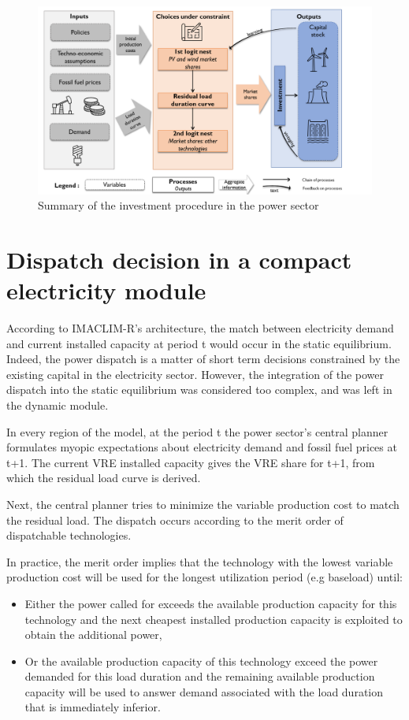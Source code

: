{\begin{figure}[H]
\includegraphics[scale=0.45]{figures&tables/Summary_nexus.png}
\centering
\caption{Summary of the investment procedure in the power sector}
\label{fig:suminv}
\end{figure}


\section{Dispatch decision in a compact electricity module}


According to IMACLIM-R's architecture, the match between electricity demand and current installed capacity at period t would occur in the static equilibrium. Indeed, the power dispatch is a matter of short term decisions constrained by the existing capital in the electricity sector. However, the integration of the power dispatch into the static equilibrium was considered too complex, and was left in the dynamic module.

In every region of the model, at the period t the power sector's central planner formulates myopic expectations about electricity demand and fossil fuel prices at t+1. The current VRE installed capacity gives the VRE share for t+1, from which the residual load curve is derived.


Next, the central planner tries to minimize the variable production cost  to match the residual load. The dispatch occurs according to the merit order of dispatchable technologies.


In practice, the merit order implies that the technology with the lowest variable production cost will be used for the longest utilization period (e.g baseload) until:

\begin{itemize}
    \item Either the power called for exceeds the available production capacity for this technology and the next cheapest installed production capacity is exploited to obtain the additional power,
    \item Or the available production capacity of this technology exceed the power demanded for this load duration and the remaining available production capacity will be used to answer demand associated with the load duration that is immediately inferior.
\end{itemize}

}
